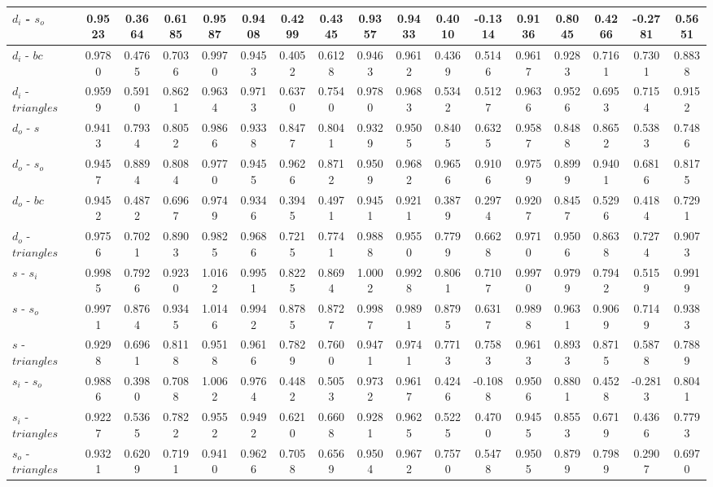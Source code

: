 \documentclass[%
 aip,
 jmp,%
 amsmath,amssymb,
 reprint,%
 floatfix,
]{revtex4-1}
\begin{document}
\begin{table}
\begin{tabular}{|l|| c|c|c|c||  c|c|c|c||   c|c|c|c||   c|c|c|c|}
$d_i$ - $s_o$ & 0.9523 & 0.3664 & 0.6185 & 0.9587 & 0.9408 & 0.4299 & 0.4345 & 0.9357 & 0.9433 & 0.4010 & -0.1314 & 0.9136 & 0.8045 & 0.4266 & -0.2781 & 0.5651 \\ \hline
$d_i$ - $bc$ & 0.9780 & 0.4765 & 0.7036 & 0.9970 & 0.9453 & 0.4052 & 0.6128 & 0.9463 & 0.9612 & 0.4369 & 0.5146 & 0.9617 & 0.9283 & 0.7161 & 0.7301 & 0.8838 \\ \hline
$d_i$ - $triangles$ & 0.9599 & 0.5910 & 0.8621 & 0.9634 & 0.9713 & 0.6370 & 0.7540 & 0.9780 & 0.9683 & 0.5342 & 0.5127 & 0.9636 & 0.9526 & 0.6953 & 0.7154 & 0.9152 \\ \hline
$d_o$ - $s$ & 0.9413 & 0.7934 & 0.8052 & 0.9866 & 0.9338 & 0.8477 & 0.8041 & 0.9329 & 0.9505 & 0.8405 & 0.6325 & 0.9587 & 0.8488 & 0.8652 & 0.5383 & 0.7486 \\ \hline
$d_o$ - $s_o$ & 0.9457 & 0.8894 & 0.8084 & 0.9770 & 0.9455 & 0.9626 & 0.8712 & 0.9509 & 0.9682 & 0.9656 & 0.9106 & 0.9759 & 0.8999 & 0.9401 & 0.6816 & 0.8175 \\ \hline
$d_o$ - $bc$ & 0.9452 & 0.4872 & 0.6967 & 0.9749 & 0.9346 & 0.3945 & 0.4971 & 0.9451 & 0.9211 & 0.3879 & 0.2974 & 0.9207 & 0.8457 & 0.5296 & 0.4184 & 0.7291 \\ \hline
$d_o$ - $triangles$ & 0.9756 & 0.7021 & 0.8903 & 0.9825 & 0.9686 & 0.7215 & 0.7741 & 0.9888 & 0.9550 & 0.7799 & 0.6628 & 0.9710 & 0.9506 & 0.8638 & 0.7274 & 0.9073 \\ \hline
$s$ - $s_i$ & 0.9985 & 0.7926 & 0.9230 & 1.0162 & 0.9951 & 0.8225 & 0.8694 & 1.0002 & 0.9928 & 0.8061 & 0.7107 & 0.9970 & 0.9799 & 0.7942 & 0.5159 & 0.9919 \\ \hline
$s$ - $s_o$ & 0.9971 & 0.8764 & 0.9345 & 1.0146 & 0.9942 & 0.8785 & 0.8727 & 0.9987 & 0.9891 & 0.8795 & 0.6317 & 0.9898 & 0.9631 & 0.9069 & 0.7149 & 0.9383 \\ \hline
$s$ - $triangles$ & 0.9298 & 0.6961 & 0.8118 & 0.9518 & 0.9616 & 0.7829 & 0.7600 & 0.9471 & 0.9741 & 0.7713 & 0.7583 & 0.9613 & 0.8933 & 0.8715 & 0.5878 & 0.7889 \\ \hline
$s_i$ - $s_o$ & 0.9886 & 0.3980 & 0.7088 & 1.0062 & 0.9764 & 0.4482 & 0.5053 & 0.9732 & 0.9617 & 0.4246 & -0.1088 & 0.9506 & 0.8801 & 0.4528 & -0.2813 & 0.8041 \\ \hline
$s_i$ - $triangles$ & 0.9227 & 0.5365 & 0.7822 & 0.9552 & 0.9492 & 0.6210 & 0.6608 & 0.9281 & 0.9625 & 0.5225 & 0.4700 & 0.9455 & 0.8553 & 0.6719 & 0.4366 & 0.7793 \\ \hline
$s_o$ - $triangles$ & 0.9321 & 0.6209 & 0.7191 & 0.9410 & 0.9626 & 0.7058 & 0.6569 & 0.9504 & 0.9672 & 0.7570 & 0.5478 & 0.9505 & 0.8799 & 0.7989 & 0.2907 & 0.6970 \\ \hline

\end{tabular}
\end{table}
\end{document}

